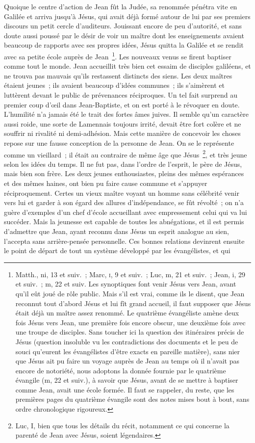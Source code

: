 \documentclass[french,twoside]{book} %
\begin{document}
Quoique le centre d’action de Jean fût la Judée, sa renommée pénétra vite en Galilée et arriva jusqu’à Jésus, qui avait déjà formé autour de lui par ses premiers discours un petit cercle d’auditeurs. Jouissant encore de peu d’autorité, et sans doute aussi poussé par le désir de voir un maître dont les enseignements avaient beaucoup de rapports avec ses propres idées, Jésus quitta la Galilée et se rendit avec sa petite école auprès de Jean \footnote{ Matth., ni, 13 et suiv. ; Marc, \textsc{i}, 9 et suiv. ; Luc, m, 21 et suiv. ; Jean, i, 29 et suiv. ; m, 22 et suiv. Les synoptiques font venir Jésus vers Jean, avant qu’il eût joué de rôle public. Mais s’il est vrai, comme ils le disent, que Jean reconnut tout d’abord Jésus et lui fît grand accueil, il faut supposer que Jésus était déjà un maître assez renommé. Le quatrième évangéliste amène deux fois Jésus vers Jean, une première fois encore obscur, une deuxième fois avec une troupe de disciples. Sans toucher ici la question des itinéraires précis de Jésus (question insoluble vu les contradictions des documents et le peu de souci qu’eurent les évangélistes d’être exacts en pareille matière), sans nier que Jésus ait pu faire un voyage auprès de Jean au temps où il n’avait pas encore de notoriété, nous adoptons la donnée fournie par le quatrième évangile (m, 22 et suiv.), à savoir que Jésus, avant de se mettre à baptiser comme Jean, avait une école formée. Il faut se rappeler, du reste, que les premières pages du quatrième évangile sont des notes mises bout à bout, sans ordre chronologique rigoureux.}. Les nouveaux venus se firent baptiser comme tout le monde. Jean accueillit très bien cet essaim de disciples galiléens, et ne trouva pas mauvais qu’ils restassent distincts des siens. Les deux maîtres étaient jeunes ; ils avaient beaucoup d’idées communes ; ils s’aimèrent et luttèrent devant le public de prévenances réciproques. Un tel fait surprend au premier coup d’œil dans Jean-Baptiste, et on est porté à le révoquer en doute. L’humilité n’a jamais été le trait des fortes âmes juives. Il semble qu’un caractère aussi roide, une sorte de Lamennais toujours irrité, devait être fort colère et ne souffrir ni rivalité ni demi-adhésion. Mais cette manière de concevoir les choses repose sur une fausse conception de la personne de Jean. On se le représente comme un vieillard ; il était au contraire de même âge que Jésus \footnote{Luc, I, bien que tous les détails du récit, notamment ce qui concerne la parenté de Jean avec Jésus, soient légendaires.}, et très jeune selon les idées du temps. Il ne fut pas, dans l’ordre de l’esprit, le père de Jésus, mais bien son frère. Les deux jeunes enthousiastes, pleins des mêmes espérances et des mêmes haines, ont bien pu faire cause commune et s’appuyer réciproquement. Certes un vieux maître voyant un homme sans célébrité venir vers lui et garder à son égard des allures d’indépendance, se fût révolté ; on n’a guère d’exemples d’un chef d’école accueillant avec empressement celui qui va lui succéder. Mais la jeunesse est capable de toutes les abnégations, et il est permis d’admettre que Jean, ayant reconnu dans Jésus un esprit analogue au sien, l’accepta sans arrière-pensée personnelle. Ces bonnes relations devinrent ensuite le point de départ de tout un système développé par les évangélistes, et qui 
\end{document}
